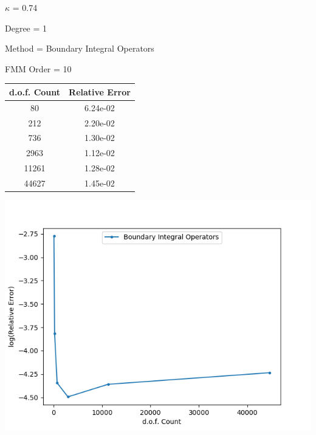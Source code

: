 \documentclass[uft8]{article}
\begin{document}
$\kappa$ = 0.74

Degree = 1

Method = Boundary Integral Operators

FMM Order = 10

\begin{longtable}{c c}
d.o.f. Count & Relative Error \\ \hline
80 & 6.24e-02 \\ \hline
212 & 2.20e-02 \\ \hline
736 & 1.30e-02 \\ \hline
2963 & 1.12e-02 \\ \hline
11261 & 1.28e-02 \\ \hline
44627 & 1.45e-02 \\ \hline
\end{longtable}

\includegraphics[width=\textwidth]{fig--free--ongraph_method-coupling--req--x_ndof--y_rel_err.png}\\ 
\end{document}
